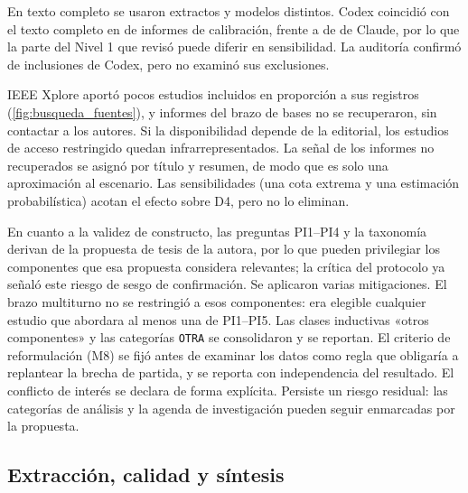 En texto completo se usaron extractos y modelos distintos. Codex coincidió con el texto completo en \nCalibCodex{} de \nCalibN{} informes de calibración, frente a \nCalibClaude{} de \nCalibN{} de Claude, por lo que la parte del Nivel 1 que revisó puede diferir en sensibilidad. La auditoría confirmó \nAuditOK{} de \nAuditN{} inclusiones de Codex, pero no examinó sus exclusiones.

IEEE Xplore aportó pocos estudios incluidos en proporción a sus registros (\cref{fig:busqueda_fuentes}), y \nNoRecuperados{} informes del brazo de bases no se recuperaron, sin contactar a los autores. Si la disponibilidad depende de la editorial, los estudios de acceso restringido quedan infrarrepresentados. La señal de los informes no recuperados se asignó por título y resumen, de modo que es solo una aproximación al escenario. Las sensibilidades (una cota extrema y una estimación probabilística) acotan el efecto sobre D4, pero no lo eliminan.

En cuanto a la validez de constructo, las preguntas PI1–PI4 y la taxonomía derivan de la propuesta de tesis de la autora, por lo que pueden privilegiar los componentes que esa propuesta considera relevantes; la crítica del protocolo ya señaló este riesgo de sesgo de confirmación. Se aplicaron varias mitigaciones. El brazo multiturno no se restringió a esos componentes: era elegible cualquier estudio que abordara al menos una de PI1--PI5. Las clases inductivas «otros componentes» y las categorías \texttt{OTRA} se consolidaron y se reportan. El criterio de reformulación (M8) se fijó antes de examinar los datos como regla que obligaría a replantear la brecha de partida, y se reporta con independencia del resultado. El conflicto de interés se declara de forma explícita. Persiste un riesgo residual: las categorías de análisis y la agenda de investigación pueden seguir enmarcadas por la propuesta.

\subsection{Extracción, calidad y síntesis}
\label{sec:am-interna}

